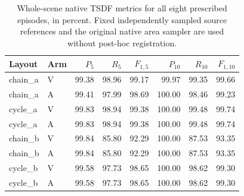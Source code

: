 \begin{table}[t]
\centering
\caption{Whole-scene native TSDF metrics for all eight prescribed episodes, in percent. Fixed independently sampled source references and the original native area sampler are used without post-hoc registration.}
\small\setlength{\tabcolsep}{4pt}
\begin{tabular}{llrrrrrr}
\toprule
Layout & Arm & $P_5$ & $R_5$ & $F_{1,5}$ & $P_{10}$ & $R_{10}$ & $F_{1,10}$ \\
\midrule
chain\_a & V & 99.38 & 98.96 & 99.17 & 99.97 & 99.35 & 99.66 \\
chain\_a & A & 99.41 & 97.99 & 98.69 & 100.00 & 98.46 & 99.23 \\
cycle\_a & V & 99.83 & 98.94 & 99.38 & 100.00 & 99.48 & 99.74 \\
cycle\_a & A & 99.83 & 98.94 & 99.38 & 100.00 & 99.48 & 99.74 \\
chain\_b & V & 99.84 & 85.80 & 92.29 & 100.00 & 87.53 & 93.35 \\
chain\_b & A & 99.84 & 85.80 & 92.29 & 100.00 & 87.53 & 93.35 \\
cycle\_b & V & 99.58 & 97.73 & 98.65 & 100.00 & 98.62 & 99.30 \\
cycle\_b & A & 99.58 & 97.73 & 98.65 & 100.00 & 98.62 & 99.30 \\
\bottomrule
\end{tabular}
\end{table}
